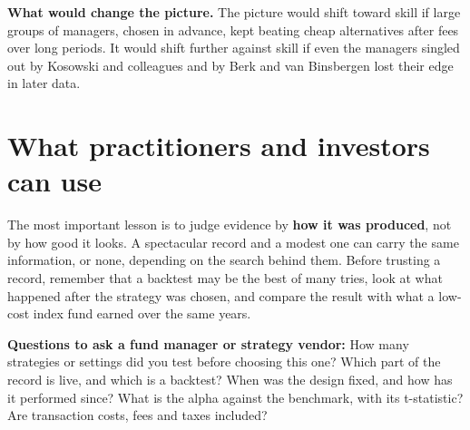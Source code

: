 \textbf{What would change the picture.} The picture would shift toward skill if large groups of managers, chosen in advance, kept beating cheap alternatives after fees over long periods. It would shift further against skill if even the managers singled out by Kosowski and colleagues and by Berk and van Binsbergen lost their edge in later data.

\section{What practitioners and investors can use}
\label{sec:01-investors}

The most important lesson is to judge evidence by \textbf{how it was produced}, not by how good it looks. A spectacular record and a modest one can carry the same information, or none, depending on the search behind them. Before trusting a record, remember that a backtest may be the best of many tries, look at what happened after the strategy was chosen, and compare the result with what a low-cost index fund earned over the same years.

\textbf{Questions to ask a fund manager or strategy vendor:} How many strategies or settings did you test before choosing this one? Which part of the record is live, and which is a backtest? When was the design fixed, and how has it performed since? What is the alpha against the benchmark, with its t-statistic? Are transaction costs, fees and taxes included?

\makeatletter
{}
\makeatother

